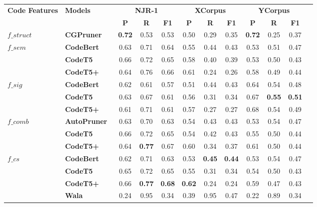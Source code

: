 \begin{tabular}{@{}llcccccccccc@{}}
\toprule
\multirow{2}{*}{\textbf{Code Features}} & \multirow{2}{*}{\textbf{Models}} & \multicolumn{3}{c}{\textbf{NJR-1}} & \multicolumn{3}{c}{\textbf{XCorpus}} & \multicolumn{3}{c}{\textbf{YCorpus}} \\
\cmidrule(lr){3-5} \cmidrule(lr){6-8} \cmidrule(lr){9-11}
& & \textbf{P} & \textbf{R} & \textbf{F1} & \textbf{P} & \textbf{R} & \textbf{F1} & \textbf{P} & \textbf{R} & \textbf{F1} \\
\midrule
\multirow{1}{*}{$f\_{struct}$} & \textbf{CGPruner~\cite{utture2022striking}} & \textbf{0.72} & 0.53 & 0.53 & 0.50 & 0.29 & 0.35 & \textbf{0.72} & 0.25 & 0.37 \\
\midrule
\multirow{3}{*}{$f\_{sem}$} 
& \textbf{CodeBert} & 0.63 & 0.71 & 0.64 & 0.55 & 0.44 & 0.43 & 0.53 & 0.51 & 0.47 \\
& \textbf{CodeT5} & 0.66 & 0.72 & 0.65 & 0.58 & 0.40 & 0.39 & 0.53 & 0.50 & 0.43 \\
& \textbf{CodeT5+} & 0.64 & 0.76 & 0.66 & 0.61 & 0.24 & 0.26 & 0.58 & 0.49 & 0.44 \\
\midrule
\multirow{3}{*}{$f\_{sig}$} 
& \textbf{CodeBert} & 0.62 & 0.61 & 0.57 & 0.51 & 0.44 & 0.43 & 0.64 & 0.54 & 0.48 \\
& \textbf{CodeT5} & 0.63 & 0.67 & 0.61 & 0.56 & 0.31 & 0.34 & 0.67 & \textbf{0.55} & \textbf{0.51} \\
& \textbf{CodeT5+} & 0.61 & 0.71 & 0.61 & 0.57 & 0.27 & 0.27 & 0.68 & 0.54 & 0.49 \\
\midrule
\multirow{3}{*}{$f\_{comb}$} 
& \textbf{AutoPruner~\cite{le2022autopruner}} & 0.63 & 0.70 & 0.63 & 0.54 & 0.43 & 0.43 &  0.53 & 0.54 & 0.47 \\
& \textbf{CodeT5} & 0.66 & 0.72 & 0.65 & 0.54 & 0.42 & 0.43 & 0.55 & 0.50 & 0.44 \\
& \textbf{CodeT5+} & 0.64 & \textbf{0.77} & 0.67 & 0.60 & 0.34 & 0.37 & 0.61 & 0.50 & 0.44 \\
\midrule
\multirow{3}{*}{$f\_{cs}$} 
& \textbf{CodeBert} & 0.62 & 0.71 & 0.63 & 0.53 & \textbf{0.45} & \textbf{0.44} & 0.53 & 0.54 & 0.47 \\
& \textbf{CodeT5} & 0.65 & 0.72 & 0.65 & 0.55 & 0.31 & 0.34 & 0.54 & 0.50 & 0.43 \\
& \textbf{CodeT5+} & 0.66 & \textbf{0.77} & \textbf{0.68} & \textbf{0.62} & 0.24 & 0.24 & 0.59 & 0.47 & 0.43 \\
\midrule
 & \textbf{Wala} & 0.24 & 0.95 & 0.34 & 0.39 & 0.95 & 0.47 & 0.22 & 0.89 & 0.34 \\
\bottomrule
\end{tabular}
